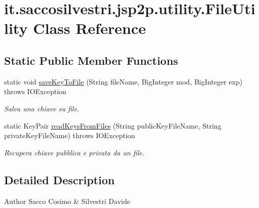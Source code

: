 \hypertarget{classit_1_1saccosilvestri_1_1jsp2p_1_1utility_1_1_file_utility}{
\section{it.saccosilvestri.jsp2p.utility.\-File\-Utility \-Class \-Reference}
\label{classit_1_1saccosilvestri_1_1jsp2p_1_1utility_1_1_file_utility}
}
\subsection*{\-Static \-Public \-Member \-Functions}
\begin{DoxyCompactItemize}
\item 
static void \hyperlink{classit_1_1saccosilvestri_1_1jsp2p_1_1utility_1_1_file_utility_aab13a11d048dd52812c8b3b5c9193ffe}{save\-Key\-To\-File} (\-String file\-Name, \-Big\-Integer mod, \-Big\-Integer exp)  throws I\-O\-Exception 
\begin{DoxyCompactList}\small\item\em \-Salva una chiave su file. \end{DoxyCompactList}\item 
static \-Key\-Pair \hyperlink{classit_1_1saccosilvestri_1_1jsp2p_1_1utility_1_1_file_utility_ae623758a16014c060c21b22113b767d4}{read\-Keys\-From\-Files} (\-String public\-Key\-File\-Name, \-String private\-Key\-File\-Name)  throws I\-O\-Exception 
\begin{DoxyCompactList}\small\item\em \-Recupera chiave pubblica e privata da un file. \end{DoxyCompactList}\end{DoxyCompactItemize}


\subsection{\-Detailed \-Description}
\begin{DoxyAuthor}{\-Author}
\-Sacco \-Cosimo \& \-Silvestri \-Davide 
\end{DoxyAuthor}


